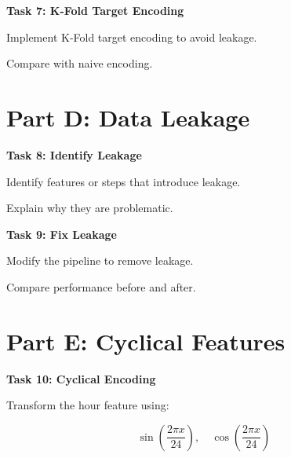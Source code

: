 \documentclass[12pt,a4paper]{article}
\begin{document}
\vspace{6pt}

\begin{tcolorbox}
\textbf{Task 7: K-Fold Target Encoding}

Implement K-Fold target encoding to avoid leakage.

Compare with naive encoding.

\vspace{2cm}

\vspace{2cm}
\end{tcolorbox}


\section*{Part D: Data Leakage}

\begin{tcolorbox}
\textbf{Task 8: Identify Leakage}

Identify features or steps that introduce leakage.

Explain why they are problematic.

\vspace{2cm}

\vspace{2cm}
\end{tcolorbox}

\vspace{6pt}

\begin{tcolorbox}
\textbf{Task 9: Fix Leakage}

Modify the pipeline to remove leakage.

Compare performance before and after.

\vspace{2cm}

\vspace{2cm}
\end{tcolorbox}


\section*{Part E: Cyclical Features}

\begin{tcolorbox}
\textbf{Task 10: Cyclical Encoding}

Transform the hour feature using:

\[
\sin\left(\frac{2\pi x}{24}\right), \quad
\cos\left(\frac{2\pi x}{24}\right)
\]

\vspace{2cm}

\vspace{2cm}
\end{tcolorbox}
\end{document}
